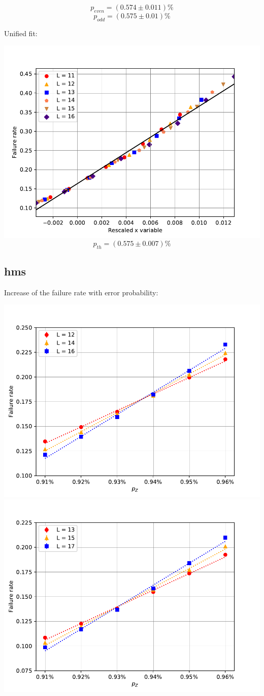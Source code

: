 \documentclass[pra]{revtex4-1}
\begin{document}
\[  p_{even} = (0.574 \pm 0.011)\% \]
\[  p_{odd} = (0.575 \pm 0.01)\% \]
\clearpage 

Unified fit: \begin{center} 

\includegraphics[width=.9\textwidth]{../graphs-paper2/ftw-dephasing-rescaled.pdf}
\[  p_{th} = (0.575 \pm 0.007)\% \] \end{center}
\clearpage 

\subsection*{hms}
\noindent Increase of the failure rate with error probability: 
  
\includegraphics[width=.49\textwidth]{../graphs-paper2/hms-dephasing-even.pdf}
\includegraphics[width=.49\textwidth]{../graphs-paper2/hms-dephasing-odd.pdf}
\end{document}
